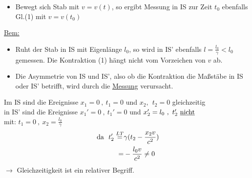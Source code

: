\documentclass[titlepage,12pt,a4paper,ngerman]{report}
\newcommand{\tx}[1]{\textrm{#1}}
\begin{document}
\begin{itemize}
	\item Bewegt sich Stab mit $ v = v(t) $, so ergibt Messung in IS zur Zeit $ t_0 $ ebenfalls Gl.(1) mit $ v=v(t_0) $
\end{itemize}
\underline{Bem:}
\begin{itemize}
	\item Ruht der Stab in IS mit Eigenlänge $ l_0 $, so wird in IS' ebenfalls $ l=\frac{l_0}{\gamma} < l_0 $ gemessen. Die Kontraktion (1) hängt nicht vom Vorzeichen von $ v $ ab.
	\item Die Asymmetrie von IS und IS', also ob die Kontraktion die Maßstäbe in IS oder IS' betrifft, wird durch die \underline{Messung} verursacht.
\end{itemize}
Im IS sind die Ereignisse $ x_1 = 0\ , \ t_1 = 0 $ und $ x_2,\ \ t_2 = 0 $ gleichzeitig\\
in IS' sind die Ereignisse $ x_1' = 0 \ , \ t_1' = 0 $ und $ x_2' = l_0 \ , \ t_2' \tx{ \underline{nicht} } $\\
mit: $ t_1 = 0  \ , \ x_2 = \frac{l_0}{\gamma} $
\begin{align*}
\tx{ da } \ t_2' \buildrel LT \over = &\gamma (t_2 - \frac{x_2 v}{c^2})\\
= &- \frac{l_0 v}{c^2} \neq 0
\end{align*} 
$ \rightarrow $ Gleichzeitigkeit ist ein relativer Begriff.
\end{document}
